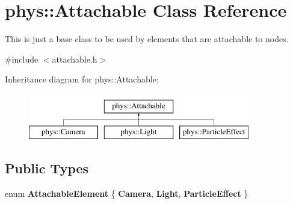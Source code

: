 \hypertarget{classphys_1_1Attachable}{
\section{phys::Attachable Class Reference}
\label{df/dbd/classphys_1_1Attachable}
}


This is just a base class to be used by elements that are attachable to nodes.  




{\ttfamily \#include $<$attachable.h$>$}

Inheritance diagram for phys::Attachable:\begin{figure}[H]
\begin{center}
\leavevmode
\includegraphics[height=2.000000cm]{df/dbd/classphys_1_1Attachable}
\end{center}
\end{figure}
\subsection*{Public Types}
\begin{DoxyCompactItemize}
\item 
enum {\bfseries AttachableElement} \{ {\bfseries Camera}, 
{\bfseries Light}, 
{\bfseries ParticleEffect}
 \}
\end{DoxyCompactItemize}
